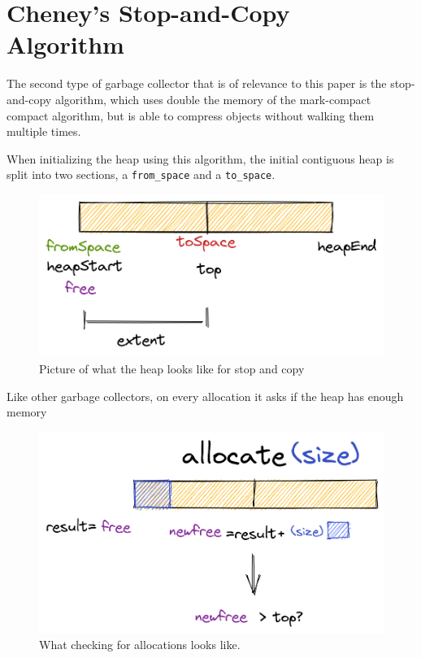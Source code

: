\documentclass[index]{subfiles}
\begin{document}
\section{Cheney's Stop-and-Copy Algorithm}

The second type of garbage collector that is of relevance to this paper is the stop-and-copy algorithm, which uses double the memory of the mark-compact compact algorithm, but is able to compress objects without walking them multiple times.

When initializing the heap using this algorithm, the initial contiguous heap is split into two sections, a \verb+from_space+ and a \verb+to_space+.

\begin{figure}[H]
    \centering
    \includegraphics[scale=0.3]{pics/split-heap-diagram.png}
    \caption{Picture of what the heap looks like for stop and copy}
\end{figure}

Like other garbage collectors, on every allocation it asks if the heap has enough memory

\begin{figure}[H]
    \centering
    \includegraphics[scale=0.3]{pics/allocation.png}
    \caption{What checking for allocations looks like.}
\end{figure}
\end{document}
